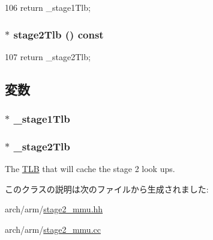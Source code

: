 \begin{DoxyCode}
106 { return _stage1Tlb; }
\end{DoxyCode}
\hypertarget{classArmISA_1_1Stage2MMU_a17482b0222f72379826534d4b65e9195}{
\subsubsection[{stage2Tlb}]{$\ast$ stage2Tlb () const}}
\label{classArmISA_1_1Stage2MMU_a17482b0222f72379826534d4b65e9195}



\begin{DoxyCode}
107 { return _stage2Tlb; }
\end{DoxyCode}


\subsection{変数}
\hypertarget{classArmISA_1_1Stage2MMU_a33806b31f50f905dd9894ed27cd04958}{
\subsubsection[{\_\-stage1Tlb}]{$\ast$ {\bf \_\-stage1Tlb}}}
\label{classArmISA_1_1Stage2MMU_a33806b31f50f905dd9894ed27cd04958}
\hypertarget{classArmISA_1_1Stage2MMU_a8bb6ae753189e6ef8ad755ff214a0dcd}{
\subsubsection[{\_\-stage2Tlb}]{$\ast$ {\bf \_\-stage2Tlb}}}
\label{classArmISA_1_1Stage2MMU_a8bb6ae753189e6ef8ad755ff214a0dcd}
The \hyperlink{classArmISA_1_1TLB}{TLB} that will cache the stage 2 look ups. 

このクラスの説明は次のファイルから生成されました:\begin{DoxyCompactItemize}
\item 
arch/arm/\hyperlink{stage2__mmu_8hh}{stage2\_\-mmu.hh}\item 
arch/arm/\hyperlink{stage2__mmu_8cc}{stage2\_\-mmu.cc}\end{DoxyCompactItemize}
